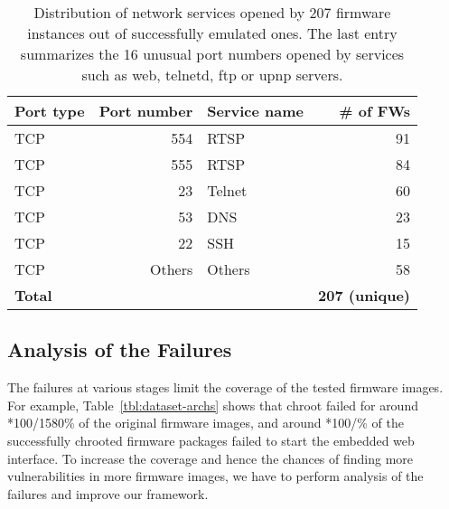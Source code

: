 \documentclass[conference]{./templates/ndss/IEEEtran}
\newcounter{t0d0_counter}
\newcounter{pr00f_counter}
\newcommand\printpercent[2]{\the\numexpr#1*100/#2\%}
\newcommand{\countfirmwareforemulation}{1580}
\newcommand{\CountFirmwareEmulatedNOTOK}{1092}
\newcommand{\CountFirmwareEmulatedWebServerNOTStarted}{242}
\newcommand{\CountFirmwaresOtherServices}{207}
\begin{document}
\begin{table}[tbh]
\centering
\caption{Distribution of network services  opened by
  \CountFirmwaresOtherServices{} firmware instances out of
  \CountFirmwareEmulatedOK{} successfully emulated ones. The last
  entry summarizes the 16 unusual port numbers opened by
  services such as web, telnetd, ftp or upnp servers.
}
\begin{tabular}{lrlr}
\\
\toprule
\textbf{Port type} & \textbf{Port number} & \textbf{Service name} & \textbf{\# of FWs} \\
\midrule

TCP     &   554         &   RTSP            &     91      \\
TCP     &   555         &   RTSP            &     84      \\
TCP     &   23          &   Telnet          &     60      \\
TCP     &   53          &   DNS             &     23      \\
TCP     &   22          &   SSH             &     15      \\
TCP     &   Others      &   Others          &     58      \\

\midrule
\textbf{Total} &   &                  &   \textbf{\CountFirmwaresOtherServices{} (unique)} \\

\bottomrule

\end{tabular}
\label{tbl:net-svc}
\end{table}




















\subsection{Analysis of the Failures}
\label{sec:results-failures}


The failures at various stages limit the coverage of the tested 
firmware images. 
For example, Table~\ref{tbl:dataset-archs} shows that chroot failed for around 
\printpercent{\CountFirmwareEmulatedNOTOK}{\countfirmwareforemulation} 
of the original firmware images, and around \printpercent{\CountFirmwareEmulatedWebServerNOTStarted}{\CountFirmwareEmulatedOK} 
of the successfully chrooted firmware packages failed to start the embedded web interface. 
To increase the coverage and hence the chances of finding more 
vulnerabilities in more firmware images, we have to perform analysis of 
the failures and improve our framework. 
\end{document}
